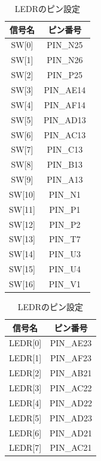 \documentclass[12pt,a4paper]{ltjsarticle}
\begin{document}
\begin{table}[H]
  \begin{minipage}[t]{0.48\linewidth}
    \centering
    \caption{SWのピン設定}
    \label{tab:pin-sw}
    \begin{tabular}{cc}
      \toprule
      信号名 & ピン番号 \\
      \midrule
      SW{[0]}  & PIN\_N25  \\
      SW{[1]}  & PIN\_N26  \\
      SW{[2]}  & PIN\_P25  \\
      SW{[3]}  & PIN\_AE14 \\
      SW{[4]}  & PIN\_AF14 \\
      SW{[5]}  & PIN\_AD13 \\
      SW{[6]}  & PIN\_AC13 \\
      SW{[7]}  & PIN\_C13  \\
      SW{[8]}  & PIN\_B13  \\
      SW{[9]}  & PIN\_A13  \\
      SW{[10]} & PIN\_N1   \\
      SW{[11]} & PIN\_P1   \\
      SW{[12]} & PIN\_P2   \\
      SW{[13]} & PIN\_T7   \\
      SW{[14]} & PIN\_U3   \\
      SW{[15]} & PIN\_U4   \\
      SW{[16]} & PIN\_V1   \\
      \bottomrule
    \end{tabular}
  \end{minipage}
  \hfill
  \begin{minipage}[t]{0.48\linewidth}
    \centering
    \caption{LEDRのピン設定}
    \label{tab:pin-ledr}
    \begin{tabular}{cc}
      \toprule
      信号名 & ピン番号 \\
      \midrule
      LEDR{[0]}  & PIN\_AE23 \\
      LEDR{[1]}  & PIN\_AF23 \\
      LEDR{[2]}  & PIN\_AB21 \\
      LEDR{[3]}  & PIN\_AC22 \\
      LEDR{[4]}  & PIN\_AD22 \\
      LEDR{[5]}  & PIN\_AD23 \\
      LEDR{[6]}  & PIN\_AD21 \\
      LEDR{[7]}  & PIN\_AC21 \\

\end{tabular}
\end{minipage}
\end{table}
\end{document}
